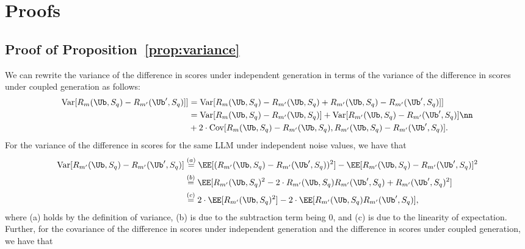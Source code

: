 \section{Proofs} \label{sec:proofs}

\subsection{Proof of Proposition~\ref{prop:variance}}
 We can rewrite the variance of the difference in scores under independent generation in terms of the variance of the difference in scores under coupled generation as follows:
    \begin{align*}
        \Var[R_m(\Ub,S_q)-R_{m'}(\Ub',S_q)] ] 
        &= \Var[R_m(\Ub,S_q)-R_{m'}(\Ub,S_q) + R_{m'}(\Ub,S_q) -R_{m'}(\Ub',S_q)] ] \nonumber
        \\ &= \Var[R_m(\Ub,S_q)-R_{m'}(\Ub,S_q)] + \Var[R_{m'}(\Ub,S_q)-R_{m'}(\Ub',S_q)] \nn
            \\ &+ 2 \cdot \Cov[R_m(\Ub,S_q)-R_{m'}(\Ub,S_q), R_{m'}(\Ub,S_q)-R_{m'}(\Ub',S_q) ]. 
    \end{align*}
%
For the variance of the difference in scores for the same LLM under independent noise values, we have that
%
    \begin{align*}
        \Var[R_{m'}(\Ub,S_q)-R_{m'}(\Ub',S_q)]
        & \overset{(a)}{=} \EE[(R_{m'}(\Ub,S_q)-R_{m'}(\Ub',S_q))^2] -
         \EE[R_{m'}(\Ub,S_q)-R_{m'}(\Ub',S_q)]^2 %
        \\& \overset{(b)}{=} \EE[R_{m'}(\Ub,S_q)^2-2\cdot R_{m'}(\Ub,S_q)R_{m'}(\Ub',S_q) + R_{m'}(\Ub',S_q)^2] %
        \\& \overset{(c)}{=} 2 \cdot \EE[R_{m'}(\Ub,S_q)^2] - 2 \cdot \EE[R_{m'}(\Ub,S_q)R_{m'}(\Ub',S_q)], %
    \end{align*}
%
where (a) holds by the definition of variance, (b) is due to the subtraction term being $0$, and (c) is due to the linearity of expectation.
%
Further, for the covariance of the difference in scores under independent generation and the difference in scores under coupled generation, we have that
%
\begingroup
\allowdisplaybreaks
